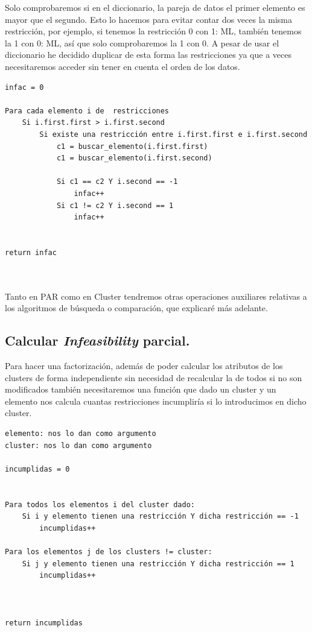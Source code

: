 \documentclass[12pt, spanish]{article}
\begin{document}
Solo comprobaremos si en el diccionario, la pareja de datos el primer elemento es mayor que el segundo. Esto lo hacemos para evitar contar dos veces la misma restricción, por ejemplo, si tenemos la restricción 0 con 1: ML, también tenemos la 1 con 0: ML, así que solo comprobaremos la 1 con 0. A pesar de usar el diccionario he decidido duplicar de esta forma las restricciones ya que a veces necesitaremos acceder sin tener en cuenta el orden de los datos.

\newpage

\begin{lstlisting}
infac = 0

Para cada elemento i de  restricciones
	Si i.first.first > i.first.second
		Si existe una restricción entre i.first.first e i.first.second
			c1 = buscar_elemento(i.first.first)
			c1 = buscar_elemento(i.first.second)
			
			Si c1 == c2 Y i.second == -1
				infac++
			Si c1 != c2 Y i.second == 1
				infac++
		
		
return infac
	
	
\end{lstlisting}




Tanto en PAR como en Cluster tendremos otras operaciones auxiliares relativas a los algoritmos de búsqueda o comparación, que explicaré más adelante.


\subsection{Calcular \textit{Infeasibility} parcial.}

Para hacer una factorización, además de poder calcular los atributos de los clusters de forma independiente sin necesidad de recalcular la de todos si no son modificados también necesitaremos una función que dado un cluster y un elemento nos calcula cuantas restricciones incumpliría si lo introducimos en dicho cluster.


\begin{lstlisting}
elemento: nos lo dan como argumento
cluster: nos lo dan como argumento

incumplidas = 0


Para todos los elementos i del cluster dado:
	Si i y elemento tienen una restricción Y dicha restricción == -1
		incumplidas++

Para los elementos j de los clusters != cluster:
	Si j y elemento tienen una restricción Y dicha restricción == 1
		incumplidas++



return incumplidas
	
	
\end{lstlisting}
\end{document}
